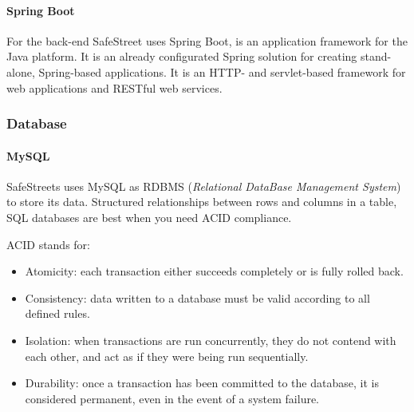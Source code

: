 \paragraph{Spring Boot}

For the back-end SafeStreet uses Spring Boot, is an application framework for the Java platform.
It is an already configurated Spring solution for creating stand-alone, Spring-based applications. It is an HTTP- and servlet-based framework for web applications and RESTful web services.

\subsubsection{Database}

\paragraph{MySQL}

SafeStreets uses MySQL as RDBMS (\textit{Relational DataBase Management System}) to store its data.
Structured relationships between rows and columns in a table, SQL databases are best when you need ACID compliance. 

ACID stands for:
\begin{itemize}
	\item Atomicity: each transaction either succeeds completely or is fully rolled back.
	\item Consistency: data written to a database must be valid according to all defined rules.
	\item Isolation:  when transactions are run concurrently, they do not contend with each other, and act as if they were being run sequentially.
	\item Durability: once a transaction has been committed to the database, it is considered permanent, even in the event of a system failure.
\end{itemize}






